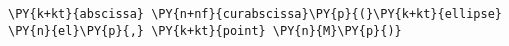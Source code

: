 \begin{Verbatim}[commandchars=\\\{\}]
      \PY{k+kt}{abscissa} \PY{n+nf}{curabscissa}\PY{p}{(}\PY{k+kt}{ellipse} \PY{n}{el}\PY{p}{,} \PY{k+kt}{point} \PY{n}{M}\PY{p}{)}
\end{Verbatim}
